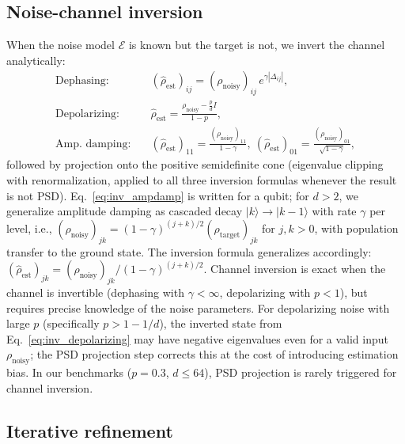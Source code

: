 \documentclass[12pt,a4paper]{article}
\newcommand{\EE}{\mathcal{E}}
\newcommand{\rhot}{\rho_\mathrm{target}}
\newcommand{\rhon}{\rho_\mathrm{noisy}}
\newcommand{\rhoe}{\hat{\rho}_\mathrm{est}}
\begin{document}
\subsection{Noise-channel inversion}
\label{sec:inversion}

When the noise model $\EE$ is known but the target is not, we invert the channel analytically:
\begin{align}
\text{Dephasing:}\quad & (\rhoe)_{ij} = (\rhon)_{ij}\,e^{\gamma|\Delta_{ij}|}, \label{eq:inv_dephasing}\\
\text{Depolarizing:}\quad & \rhoe = \frac{\rhon - \frac{p}{d}I}{1-p}, \label{eq:inv_depolarizing}\\
\text{Amp.\ damping:}\quad & (\rhoe)_{11} = \frac{(\rhon)_{11}}{1-\gamma},\ (\rhoe)_{01} = \frac{(\rhon)_{01}}{\sqrt{1-\gamma}}, \label{eq:inv_ampdamp}
\end{align}
followed by projection onto the positive semidefinite cone (eigenvalue clipping with renormalization, applied to all three inversion formulas whenever the result is not PSD).
Eq.~\eqref{eq:inv_ampdamp} is written for a qubit; for $d > 2$, we generalize amplitude damping as cascaded decay $|k\rangle \to |k-1\rangle$ with rate $\gamma$ per level, i.e., $(\rhon)_{jk} = (1-\gamma)^{(j+k)/2} (\rhot)_{jk}$ for $j,k > 0$, with population transfer to the ground state.
The inversion formula generalizes accordingly: $(\rhoe)_{jk} = (\rhon)_{jk} / (1-\gamma)^{(j+k)/2}$.
Channel inversion is exact when the channel is invertible (dephasing with $\gamma < \infty$, depolarizing with $p < 1$), but requires precise knowledge of the noise parameters.
For depolarizing noise with large $p$ (specifically $p > 1 - 1/d$), the inverted state from Eq.~\eqref{eq:inv_depolarizing} may have negative eigenvalues even for a valid input $\rhon$; the PSD projection step corrects this at the cost of introducing estimation bias.
In our benchmarks ($p = 0.3$, $d \leq 64$), PSD projection is rarely triggered for channel inversion.


\subsection{Iterative refinement}
\label{sec:iterative}
\end{document}
